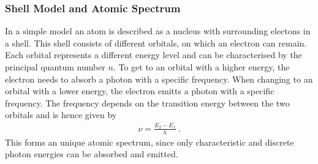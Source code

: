 \subsubsection{Shell Model and Atomic Spectrum}
\label{toc:ShellModel}
In a simple model an atom is described as a nucleus with surrounding electons in a shell. 
This shell consists of different orbitals, on which an electron can remain. 
Each orbital represents a different energy level and can be characterised by the principal quantum number $n$. 
To get to an orbital with a higher energy, the electron needs to absorb a photon with a specific frequency. 
When changing to an orbital with a lower energy, the electron emitts a photon with a specific frequency.
The frequency depends on the transition energy between the two orbitals and is hence given by
	\begin{align}
		\nu = \frac{E_2-E_1}{h}\ .
	\end{align}
This forms an unique atomic spectrum, since only characteristic and discrete photon energies can be absorbed and emitted.
